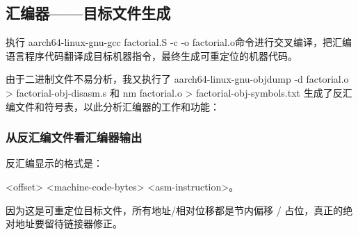 \documentclass[a4paper]{article}
\begin{document}
\subsection{汇编器——目标文件生成}
执行 aarch64-linux-gnu-gcc factorial.S -c -o factorial.o命令进行交叉编译，把汇编语言程序代码翻译成目标机器指令，最终生成可重定位的机器代码。

由于二进制文件不易分析，我又执行了 aarch64-linux-gnu-objdump -d factorial.o > factorial-obj-disasm.s 和 nm factorial.o > factorial-obj-symbols.txt 生成了反汇编文件和符号表，以此分析汇编器的工作和功能：

\subsubsection{从反汇编文件看汇编器输出}
反汇编显示的格式是：

<offset> <machine-code-bytes> <asm-instruction>。

因为这是可重定位目标文件，所有地址/相对位移都是节内偏移 / 占位，真正的绝对地址要留待链接器修正。
\end{document}
